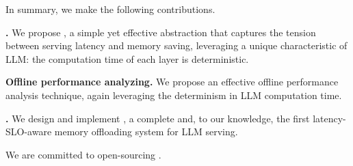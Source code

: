 In summary, we make the following contributions. 
\squishlist
%
\item{\textbf{\Interval.}}
%
We propose \interval, a simple yet effective abstraction that captures the 
tension between serving latency and memory saving, leveraging a unique characteristic of LLM: the computation time of each layer is
deterministic. 

\item{\textbf{Offline performance analyzing.}}
%
We propose an effective offline performance analysis technique, again leveraging the determinism in LLM computation time. 

\item{\textbf{\sys.}}
%
We design and implement \sys, a complete and, to our knowledge, the first 
latency-SLO-aware memory offloading system for LLM serving. 
%
\squishend

We are committed to open-sourcing \sys. 
